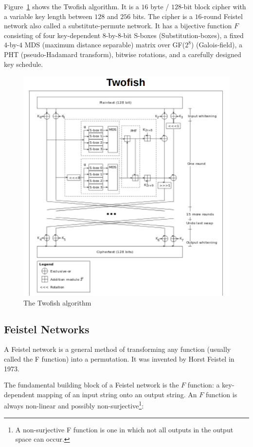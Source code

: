 Figure~\ref{fig:twofish} shows the Twofish algorithm. It is a $16$ byte / $128$-bit block cipher with a variable key length between $128$ and $256$ bits.
The cipher is a $16$-round Feistel network also called a substitute-permute network. It has a bijective function $F$ consisting of four key-dependent $8$-by-$8$-bit S-boxes (Substitution-boxes)\cite{wiki_sbox}, a fixed $4$-by-$4$ MDS (maximum distance separable) matrix over GF($2^8$) (Galois-field), a PHT (pseudo-Hadamard transform), bitwise rotations, and a carefully designed key schedule.
\begin{figure}[tp]
  \centering
  \includegraphics[scale=0.4]{Graphics/twofish.png}
  \caption{The Twofish algorithm}
  \label{fig:twofish}
\end{figure}

\subsection{Feistel Networks}
A Feistel network is a general method of transforming any function (usually called the F function) into a permutation. It was invented by Horst Feistel in 1973.

The fundamental building block of a Feistel network is the $F$ function: a key-dependent mapping of an input string onto an output string. An $F$ function is always non-linear and possibly non-surjective\footnote{A non-surjective F function is one in which not all outputs in the output space can occur.}:

